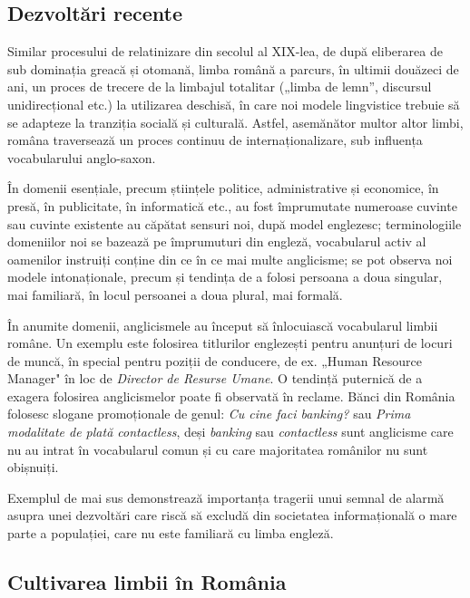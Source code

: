 \begin{multicols}{2}
\subsection{Dezvoltări recente}

Similar procesului de relatinizare din secolul al XIX-lea, de după eliberarea de sub dominația greacă și otomană, limba română a parcurs, în ultimii douăzeci de ani, un proces de trecere de la limbajul totalitar („limba de lemn”, discursul unidirecțional etc.) la utilizarea deschisă, în care noi modele lingvistice trebuie să se adapteze la tranziția socială și culturală. Astfel, asemănător multor altor limbi, româna traversează un proces continuu de internaționalizare, sub influența vocabularului anglo-saxon.

În domenii esențiale, precum științele politice, administrative și economice, în presă, în publicitate, în informatică etc., au fost împrumutate numeroase cuvinte sau cuvinte existente au căpătat sensuri noi, după model englezesc; terminologiile domeniilor noi se bazează pe împrumuturi din engleză, vocabularul activ al oamenilor instruiți conține din ce în ce mai multe anglicisme; se pot observa noi modele intonaționale, precum și tendința de a folosi persoana a doua singular, mai familiară, în locul persoanei a doua plural, mai formală.

În anumite domenii, anglicismele au început să înlocuiască vocabularul limbii române. Un exemplu este folosirea titlurilor englezești pentru anunțuri de locuri de muncă, în special pentru poziții de conducere, de ex. „Human Resource Manager" în loc de \textit{Director de Resurse Umane}. O tendință puternică de a exagera folosirea anglicismelor poate fi observată în reclame. Bănci din România folosesc slogane promoționale de genul: \textit{Cu cine faci banking?} sau \textit{Prima modalitate de plată contactless}, deși \textit{banking} sau \textit{contactless} sunt anglicisme care nu au intrat în vocabularul comun și cu care majoritatea românilor nu sunt obișnuiți.

Exemplul de mai sus demonstrează importanța tragerii unui semnal de alarmă asupra unei dezvoltări care riscă să excludă din societatea informațională o mare parte a populației, care nu este familiară cu limba engleză.

\subsection{Cultivarea limbii în România}


\end{multicols}
